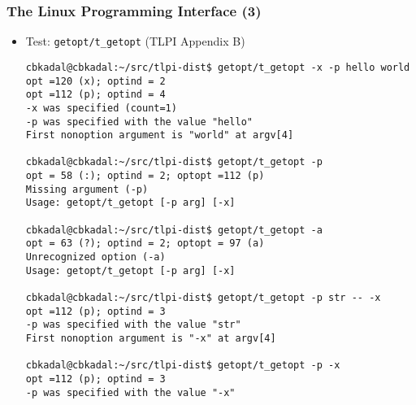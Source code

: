 \documentclass[aspectratio=169, xcolor=table, notheorems, hyperref={pdfpagelabels=false}]{beamer}
\begin{document}
\begin{frame}[fragile]
\frametitle{The Linux Programming Interface (3)}
\begin{itemize}
\item Test: \texttt{getopt/t\_getopt} (TLPI Appendix B)
\begin{lstlisting}[basicstyle=\ttfamily\tiny]
cbkadal@cbkadal:~/src/tlpi-dist$ getopt/t_getopt -x -p hello world
opt =120 (x); optind = 2
opt =112 (p); optind = 4
-x was specified (count=1)
-p was specified with the value "hello"
First nonoption argument is "world" at argv[4]

cbkadal@cbkadal:~/src/tlpi-dist$ getopt/t_getopt -p
opt = 58 (:); optind = 2; optopt =112 (p)
Missing argument (-p)
Usage: getopt/t_getopt [-p arg] [-x]

cbkadal@cbkadal:~/src/tlpi-dist$ getopt/t_getopt -a
opt = 63 (?); optind = 2; optopt = 97 (a)
Unrecognized option (-a)
Usage: getopt/t_getopt [-p arg] [-x]

cbkadal@cbkadal:~/src/tlpi-dist$ getopt/t_getopt -p str -- -x
opt =112 (p); optind = 3
-p was specified with the value "str"
First nonoption argument is "-x" at argv[4]

cbkadal@cbkadal:~/src/tlpi-dist$ getopt/t_getopt -p -x
opt =112 (p); optind = 3
-p was specified with the value "-x"

\end{lstlisting}
\end{itemize}
\end{frame}
\end{document}
